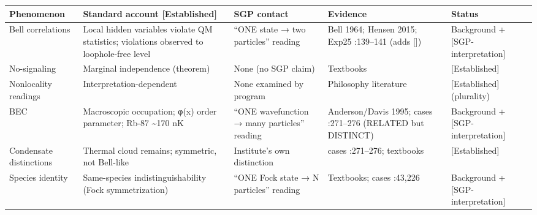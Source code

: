 \documentclass[
  11pt,
]{book}
\begin{document}
\begin{longtable}[]{@{}
  >{\raggedright\arraybackslash}p{}
  >{\raggedright\arraybackslash}p{}
  >{\raggedright\arraybackslash}p{}
  >{\raggedright\arraybackslash}p{}
  >{\raggedright\arraybackslash}p{}@{}}
\toprule\noalign{}
\begin{minipage}[b]{\linewidth}\raggedright
Phenomenon
\end{minipage} & \begin{minipage}[b]{\linewidth}\raggedright
Standard account {[}Established{]}
\end{minipage} & \begin{minipage}[b]{\linewidth}\raggedright
SGP contact
\end{minipage} & \begin{minipage}[b]{\linewidth}\raggedright
Evidence
\end{minipage} & \begin{minipage}[b]{\linewidth}\raggedright
Status
\end{minipage} \\
\midrule\noalign{}
\endhead
\bottomrule\noalign{}
\endlastfoot
Bell correlations & Local hidden variables violate QM statistics;
violations observed to loophole-free level & ``ONE state → two
particles'' reading & Bell 1964; Hensen 2015; Exp25 :139--141 (adds
{[}{]}) & Background + {[}SGP-interpretation{]} \\
No-signaling & Marginal independence (theorem) & None (no SGP claim) &
Textbooks & {[}Established{]} \\
Nonlocality readings & Interpretation-dependent & None examined by
program & Philosophy literature & {[}Established{]} (plurality) \\
BEC & Macroscopic occupation; φ(x) order parameter; Rb-87
\textasciitilde170 nK & ``ONE wavefunction → many particles'' reading &
Anderson/Davis 1995; cases :271--276 (RELATED but DISTINCT) & Background
+ {[}SGP-interpretation{]} \\
Condensate distinctions & Thermal cloud remains; symmetric, not
Bell-like & Institute's own distinction & cases :271--276; textbooks &
{[}Established{]} \\
Species identity & Same-species indistinguishability (Fock
symmetrization) & ``ONE Fock state → N particles'' reading & Textbooks;
cases :43,226 & Background + {[}SGP-interpretation{]} \\

\end{longtable}
\end{document}
